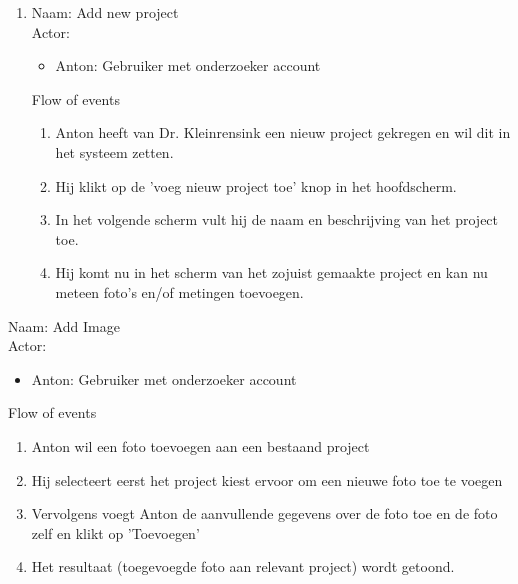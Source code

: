 \begin{enumerate}

\item   Naam: Add new project  \\
	Actor:
	\begin{itemize}
		\item Anton: Gebruiker met onderzoeker account
	\end{itemize}
	Flow of events
	\begin{enumerate}
		\item Anton heeft van Dr. Kleinrensink een nieuw project gekregen en wil dit in het systeem zetten.
		\item Hij klikt op de 'voeg nieuw project toe' knop in het hoofdscherm.
		\item In het volgende scherm vult hij de naam en beschrijving van het project toe.
		\item Hij komt nu in het scherm van het zojuist gemaakte project en kan nu meteen foto's en/of metingen toevoegen.
	\end{enumerate}
\end{enumerate}

\item   Naam: Add Image \\
	Actor:
	\begin{itemize}
		\item Anton: Gebruiker met onderzoeker account
	\end{itemize}
	Flow of events
	\begin{enumerate}
        \item Anton wil een foto toevoegen aan een bestaand project
				\item Hij selecteert eerst het project kiest ervoor om een nieuwe foto toe te voegen
				\item Vervolgens voegt Anton de aanvullende gegevens over de foto toe en de foto zelf en klikt op 'Toevoegen' 
				\item Het resultaat (toegevoegde foto aan relevant project) wordt getoond.
    \end{enumerate}


